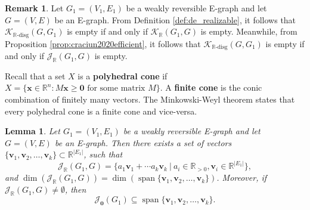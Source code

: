 \documentclass[11pt]{article}
\theoremstyle{plain}
\newtheorem{lemma}[theorem]{Lemma}
\theoremstyle{definition}
\newtheorem{remark}[theorem]{Remark}
\theoremstyle{remark}
\newcommand\RR{\mathbb{R}}
\newcommand\bx{\boldsymbol{x}}
\newcommand\bv{\boldsymbol{v}}
\newcommand{\mK}{\mathcal{K}}
\newcommand{\dK}{\mathcal{K}_{\RR\text{-disg}}}
\newcommand{\mJ}{\mathcal{J}_{\RR}}
\newcommand{\eJ}{\mathcal{J}_{\textbf{0}}}
\DeclareMathOperator{\spn}{span}
\begin{document}
\begin{remark} \label{rmk:mJ_dK}
Let $G_1 = (V_1, E_1)$ be a weakly reversible E-graph and let $G = (V, E)$ be an E-graph. From Definition \ref{def:de_realizable}, it follows that $\dK (G, G_1)$ is empty if and only if $\mK_{\RR} (G_1, G)$ is empty. Meanwhile, from Proposition \ref{prop:craciun2020efficient}, it follows that $\dK (G, G_1)$ is empty if and only if $\mJ(G_1, G)$ is empty.
\end{remark}

Recall that a set $X$ is a \textbf{polyhedral cone} if $X = \{\bx \in \RR^n: M \bx \geq \textbf{0} \text{ for some matrix } M \}$. 
A \textbf{finite cone} is the conic combination of finitely many vectors.
The Minkowski-Weyl theorem \cite{2016david} states that every polyhedral cone is a finite cone and vice-versa.

\begin{lemma}
\label{lem:j_g1_g_cone}
Let $G_1 = (V_1, E_1)$ be a weakly reversible E-graph and let $G = (V, E)$ be an E-graph. Then there exists a set of vectors $\{ \bv_1, \bv_2, \ldots, \bv_k \} \subset \RR^{|E_1|}$, such that 
\begin{equation} \label{j_g1_g_generator}
\mJ (G_1, G) = \{ a_1 \bv_1 + \cdots a_k \bv_k \ | \ a_i \in \RR_{>0}, \bv_i \in \RR^{|E_1|} \},
\end{equation} 
and $\dim (\mJ (G_1, G)) =\dim ( \spn \{ \bv_1, \bv_2, \ldots, \bv_k \} )$.
Moreover, if $\mJ (G_1, G) \neq \emptyset$, then
\[
\eJ(G_1) \subseteq \spn \{ \bv_1, \bv_2, \ldots, \bv_k \}.
\]
\end{lemma}

\end{document}

